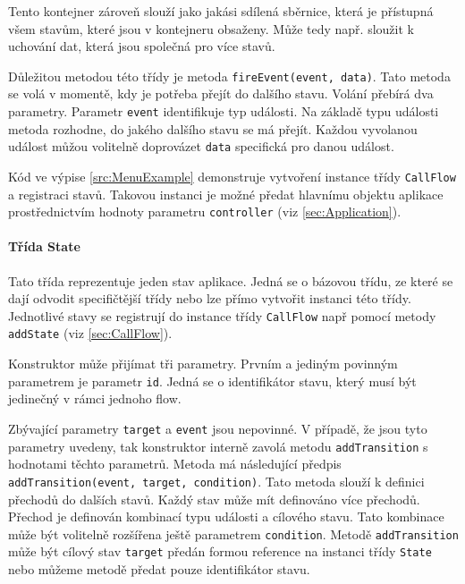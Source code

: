 \documentclass[ing,male,java,dept460]{diploma}						%
\begin{document}
Tento kontejner zároveň slouží jako jakási sdílená sběrnice, která je přístupná všem stavům, které jsou v kontejneru obsaženy. Může tedy např. sloužit k uchování dat, která jsou společná pro více stavů.

Důležitou metodou této třídy je metoda \texttt{fireEvent(event, data)}. Tato metoda se volá v momentě, kdy je potřeba přejít do dalšího stavu. Volání přebírá dva parametry. Parametr \texttt{event} identifikuje typ události. Na základě typu události metoda rozhodne, do jakého dalšího stavu se má přejít. Každou vyvolanou událost můžou volitelně doprovázet \texttt{data} specifická pro danou událost.

Kód ve výpise \ref{src:MenuExample} demonstruje vytvoření instance třídy \texttt{CallFlow} a registraci stavů. Takovou instanci je možné předat hlavnímu objektu aplikace prostřednictvím hodnoty parametru \texttt{controller} (viz \ref{sec:Application}).

\paragraph{Třída State}
\label{sec:State}
Tato třída reprezentuje jeden stav aplikace. Jedná se o bázovou třídu, ze které se dají odvodit specifičtější třídy nebo lze přímo vytvořit instanci této třídy. Jednotlivé stavy se registrují do instance třídy \texttt{CallFlow} např pomocí metody \texttt{addState} (viz \ref{sec:CallFlow}).

Konstruktor může přijímat tři parametry. Prvním a jediným povinným parametrem je parametr \texttt{id}. Jedná se o identifikátor stavu, který musí být jedinečný v rámci jednoho flow.

Zbývající parametry \texttt{target} a \texttt{event} jsou nepovinné. V případě, že jsou tyto parametry uvedeny, tak konstruktor interně zavolá metodu \texttt{addTransition} s hodnotami těchto parametrů. Metoda má následující předpis \texttt{addTransition(event, target, condition)}. Tato metoda slouží k definici přechodů do dalších stavů. Každý stav může mít definováno více přechodů. Přechod je definován kombinací typu události a cílového stavu. Tato kombinace může být volitelně rozšířena ještě parametrem \texttt{condition}. Metodě \texttt{addTransition} může být cílový stav \texttt{target} předán formou reference na instanci třídy \texttt{State} nebo můžeme metodě předat pouze identifikátor stavu.
\end{document}
